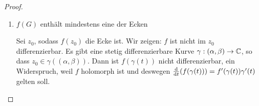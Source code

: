 \begin{proof}
\begin{parts}
\begin{enumerate}[label=(\roman*)]
			\begin{Lemma}
				Holomorphe funktionen $h:\C\to \R$ sind konstant.
			\end{Lemma}
			\begin{proof}
				\begin{align*}
					h'(z_0)=&\left.\pdv{h}{x}\right|_{z_0}\\
					=&\lim_{x \to x_0} \frac{h(x+iy_0)-h(x_0+iy_0)}{x-x_0}\in \R\\
					h'(z_0)=&\left. \pdv{h}{y}\right|_{z_0}\\
					=&\lim_{y \to y_0} \frac{h(x+iy)-h(x+iy_0)}{iy-iy_0} \in \{0\} \times \R\subseteq \C
				\end{align*}
				Das heißt: $h'(z_0)=0$ f\"{u}r alle $z_0\in \C$ und $h$ ist konstant.
			\end{proof}
		\item $f(G)$ enthält mindestens eine der Ecken

			Sei $z_0$, sodass $f(z_0)$ die Ecke ist. Wir zeigen: $f$ ist nicht im $z_0$ differenzierbar. Es gibt eine stetig differenzierbare Kurve $\gamma:(\alpha,\beta)\to \mathbb{C}$, so dass $z_0\in \gamma( (\alpha,\beta))$. Dann ist $f(\gamma(t))$ nicht differenzierbar, ein Widerspruch, weil $f$ holomorph ist und deswegen $\dv{t}(f(\gamma(t)))=f'(\gamma(t))\gamma'(t)$ gelten soll.\qedhere
	\end{enumerate}
	\end{parts}
\end{proof}


